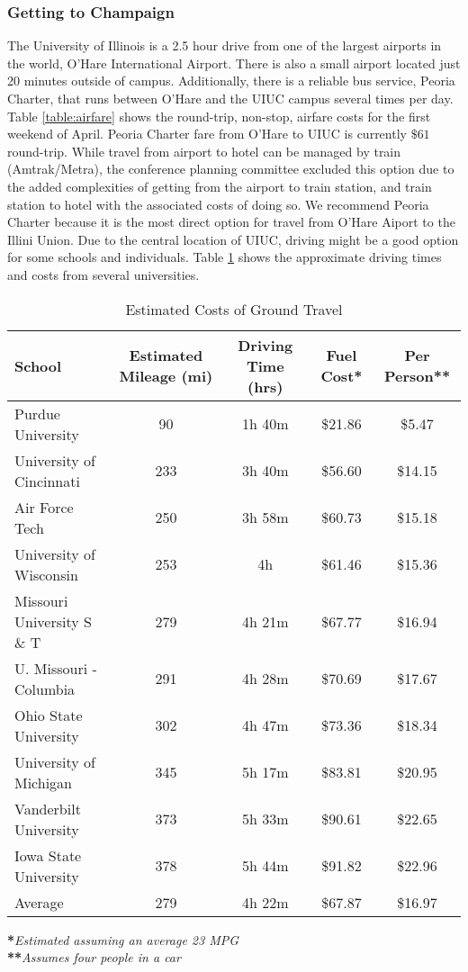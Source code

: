 \subsubsection{Getting to Champaign}
The University of Illinois is a 2.5 hour drive from one of the largest airports in the world, O'Hare International Airport. There is also a small airport located just 20 minutes outside of campus. Additionally, there is a reliable bus service, Peoria Charter, that runs between O'Hare and the UIUC campus several times per day. Table \ref{table:airfare} shows the round-trip, non-stop, airfare costs for the first weekend of April. Peoria Charter fare from O'Hare to UIUC is currently $\$61$ round-trip. While travel from airport to hotel can be managed by train (Amtrak/Metra), the conference planning committee excluded this option due to the added complexities of getting from the airport to train station, and train station to hotel with the associated costs of doing so. We recommend Peoria Charter because it is the most direct option for travel from O'Hare Aiport to the Illini Union. Due to the central location of UIUC, driving might be a good option for some schools and individuals. Table \ref{table:ground} shows the approximate driving times and costs from several universities. 

\begin{table}[H]
\caption{Estimated Costs of Ground Travel}
\label{table:ground}
   \begin{tabular}{lcccc}
   \hline\hline
   \textbf{School}&\textbf{Estimated Mileage (mi)}&\textbf{Driving Time (hrs)}&\textbf{Fuel Cost*}&\textbf{Per Person**}\\
   \hline\hline
    Purdue University&90&1h 40m&\$21.86&\$5.47\\
    University of Cincinnati&233& 3h 40m&\$56.60&\$14.15\\
    Air Force Tech &250&3h 58m&\$60.73&\$15.18\\
    University of Wisconsin&253&4h&\$61.46&\$15.36\\
    Missouri University S \& T &279&4h 21m&\$67.77&\$16.94\\
    U. Missouri - Columbia&291&4h 28m&\$70.69&\$17.67\\
    Ohio State University&302&4h 47m&\$73.36&\$18.34\\
    University of Michigan&345&5h 17m&\$83.81&\$20.95\\
    Vanderbilt University&373&5h 33m&\$90.61&\$22.65\\
    Iowa State University&378&5h 44m&\$91.82&\$22.96\\
    \hline
    Average&279&4h 22m&\$67.87&\$16.97

    \end{tabular} 
\end{table}
\noindent\textbf{*}\textit{Estimated assuming an average 23 MPG}\\
\textbf{**}\textit{Assumes four people in a car}

